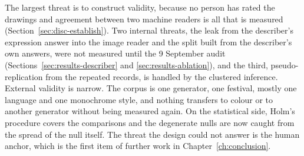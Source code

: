The largest threat is to construct validity, because no person has rated the drawings and agreement between two machine readers is all that is measured (Section~\ref{sec:disc-establish}). Two internal threats, the leak from the describer's expression answer into the image reader and the split built from the describer's own answers, were not measured until the 9 September audit (Sections~\ref{sec:results-describer} and \ref{sec:results-ablation}), and the third, pseudo-replication from the \nRepeats{} repeated records, is handled by the clustered inference. External validity is narrow. The corpus is one generator, one festival, mostly one language and one monochrome style, and nothing transfers to colour or to another generator without being measured again. On the statistical side, Holm's procedure covers the \HolmM{} comparisons and the degenerate nulls are now caught from the spread of the null itself. The threat the design could not answer is the human anchor, which is the first item of further work in Chapter~\ref{ch:conclusion}.
